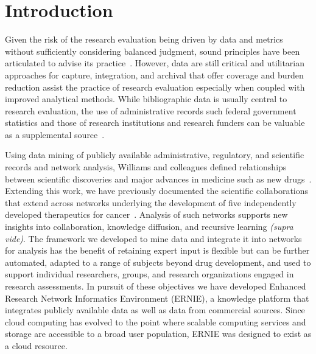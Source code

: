 \documentclass[review]{elsarticle}
\begin{document}
\linenumbers
\raggedright

\section*{Introduction}

Given the risk of the research evaluation being driven by data and metrics without sufficiently considering balanced judgment, sound principles have been articulated to advise its practice~\cite{LeidenManifesto2015}. However, data are still critical and utilitarian approaches for capture, integration, and archival that offer coverage and burden reduction assist the practice of research evaluation especially when coupled with improved analytical methods. While bibliographic data is usually central to research evaluation, the use of administrative records such federal government statistics and those of research institutions and research funders can be valuable as a supplemental source~\cite{FedStat2017}.

Using data mining of publicly available administrative, regulatory, and scientific records and network analysis, Williams and colleagues defined relationships between scientific discoveries and major advances in medicine such as new drugs~\cite{Williams2015}. Extending this work, we have previously documented the scientific collaborations that extend across networks underlying the development of five independently developed therapeutics for cancer~\cite{Keserci2017}. Analysis of such networks supports new insights into collaboration, knowledge diffusion, and recursive learning \textit{(supra vide)}. The framework we developed to mine data and integrate it into networks for analysis has the benefit of retaining expert input is flexible but can be further automated, adapted to a range of subjects beyond drug development, and used to support individual researchers, groups, and research organizations engaged in research assessments. In pursuit of these objectives we have developed Enhanced Research Network Informatics Environment (ERNIE), a knowledge platform that integrates publicly available data as well as data from commercial sources. Since cloud computing has evolved to the point where scalable computing services and storage are accessible to a broad user population, ERNIE was designed to exist as a cloud resource.
\end{document}
